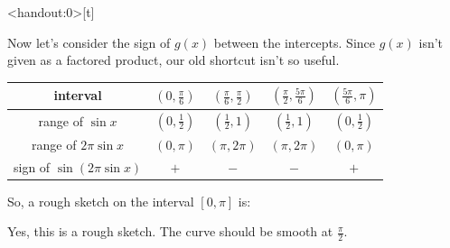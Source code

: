 \begin{frame}<handout:0>[t]
\hfill\hyperlink{endofgx}{}
\color{answercolor}

Now let's consider the sign of $g(x)$ between the intercepts. Since $g(x)$ isn't given as a factored product, our old shortcut isn't so useful.
\begin{tabular}{*{5}{|c} |}
\hline
interval&$\left(0,\tfrac\pi6\right)$ 
& $\left(\tfrac\pi6, \tfrac{\pi}{2}\right)$
& $\left(\tfrac\pi2, \tfrac{5\pi}{6}\right)$
& $\left( \tfrac{5\pi}{6},\pi\right)$\\
\hline
range of $\sin x$ & $\left(0,\tfrac12\right)$
& $\left(\tfrac12,1\right)$
& $\left(\tfrac12,1\right)$
& $\left(0,\tfrac12\right)$
\\ \hline
range of $2\pi\sin x$ & $\left(0,\pi\right)$
& $\left(\pi,2\pi\right)$
& $\left(\pi,2\pi\right)$
& $\left(0,\pi\right)$
\\ \hline
sign of $\sin(2\pi\sin x)$ & $+$
& $-$
& $-$
& $+$
\\ \hline
\end{tabular}\vfill

So, a rough sketch on the interval $[0,\pi]$ is:

\begin{center}
\end{center}

Yes, this is a rough sketch. The curve should be smooth at $\frac{\pi}{2}$.
\end{frame}
